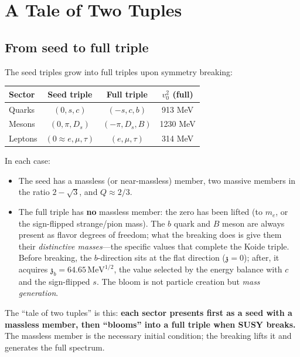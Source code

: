 \documentclass[12pt,a4paper]{article}
\newcommand{\MeV}{\,\text{MeV}}
\newcommand{\zch}{\mathfrak{z}}
\begin{document}
\section{A Tale of Two Tuples}
\label{sec:two_tuples}

\subsection{From seed to full triple}

The seed triples grow into full triples upon symmetry breaking:

\begin{center}
\begin{tabular}{lccc}
\toprule
Sector & Seed triple & Full triple & $v_0^2$ (full) \\
\midrule
Quarks & $(0, s, c)$ & $(-s, c, b)$ & 913 MeV \\
Mesons & $(0, \pi, D_s)$ & $(-\pi, D_s, B)$ & 1230 MeV \\
Leptons & $(0 \approx e, \mu, \tau)$ & $(e, \mu, \tau)$ & 314 MeV \\
\bottomrule
\end{tabular}
\end{center}

In each case:
\begin{itemize}
\item The seed has a massless (or near-massless) member, two massive 
members in the ratio $2 - \sqrt{3}$, and $Q \approx 2/3$.
\item The full triple has \textbf{no} massless member: the zero has 
been lifted (to $m_e$, or the sign-flipped strange/pion mass). The 
$b$ quark and $B$ meson are always present as flavor degrees of 
freedom; what the breaking does is give them their \emph{distinctive 
masses}---the specific values that complete the Koide triple. Before 
breaking, the $b$-direction sits at the flat direction ($\zch = 0$); 
after, it acquires $\zch_b = 64.65\MeV^{1/2}$, the value selected 
by the energy balance with $c$ and the sign-flipped $s$. The bloom 
is not particle creation but \emph{mass generation}.
\end{itemize}

The ``tale of two tuples'' is this: \textbf{each sector presents 
first as a seed with a massless member, then ``blooms'' into a 
full triple when SUSY breaks.} The massless member is the necessary 
initial condition; the breaking lifts it and generates the full spectrum.
\end{document}

